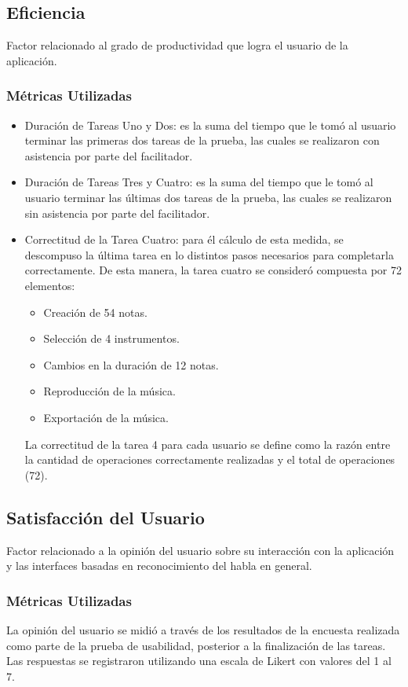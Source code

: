 \subsection{Eficiencia}
Factor relacionado al grado de productividad que logra el usuario de la aplicaci\'on.
\subsubsection{M\'etricas Utilizadas}
\begin{itemize}
	\item Duraci\'on de Tareas Uno y Dos: es la suma del tiempo que le tom\'o al usuario
	terminar las primeras dos tareas de la prueba, las cuales se realizaron con asistencia por
	parte del facilitador.
	\item Duraci\'on de Tareas Tres y Cuatro: es la suma del tiempo que le tom\'o al usuario
	terminar las \'ultimas dos tareas de la prueba, las cuales se realizaron sin asistencia por
	parte del facilitador.
	\item Correctitud de la Tarea Cuatro: para \'el c\'alculo de esta medida, se descompuso la
	\'ultima tarea en lo distintos pasos necesarios para completarla correctamente.
	De esta manera, la tarea cuatro se consider\'o compuesta por 72 elementos:
	\begin{itemize}
		\item Creaci\'on de 54 notas.
		\item Selecci\'on de 4 instrumentos.
		\item Cambios en la duraci\'on de 12 notas.
		\item Reproducci\'on de la m\'usica.
		\item Exportaci\'on de la m\'usica.
	\end{itemize}
	La correctitud de la tarea 4 para cada usuario se define como la raz\'on entre la cantidad de operaciones
	correctamente realizadas y el total de operaciones (72).
\end{itemize}

\subsection{Satisfacci\'on del Usuario}
Factor relacionado a la opini\'on del usuario sobre su interacci\'on con la aplicaci\'on y las interfaces
basadas en reconocimiento del habla en general.
\subsubsection{M\'etricas Utilizadas}
La opini\'on del usuario se midi\'o a trav\'es de los resultados de la encuesta realizada como parte de
la prueba de usabilidad, posterior a la finalizaci\'on de las tareas. Las respuestas se
registraron utilizando una escala de Likert \cite{Allen:2007} con valores del 1 al 7.

